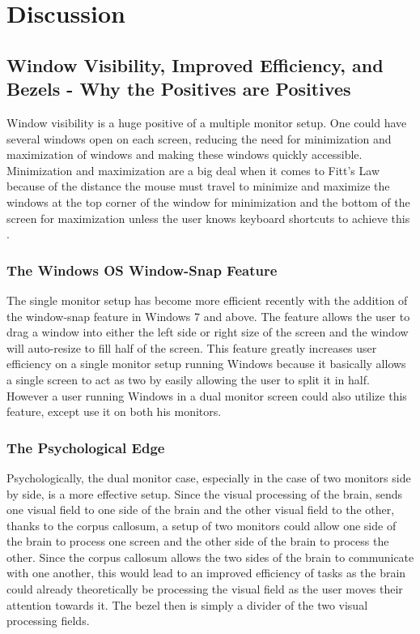 \documentclass[a4paper]{article}
\begin{document}
\section{Discussion}
\subsection{Window Visibility, Improved Efficiency, and Bezels - Why the Positives are Positives}
Window visibility is a huge positive of a multiple monitor setup. One could have several windows open on each screen, reducing the need for minimization and maximization of windows and making these windows quickly accessible. Minimization and maximization are a big deal when it comes to Fitt's Law because of the distance the mouse must travel to minimize and maximize the windows at the top corner of the window for minimization and the bottom of the screen for maximization unless the user knows keyboard shortcuts to achieve this \cite{Tog}.
\subsubsection{The Windows OS Window-Snap Feature}
The single monitor setup has become more efficient recently with the addition of the window-snap feature in Windows 7 and above. The feature allows the user to drag a window into either the left side or right size of the screen and the window will auto-resize to fill half of the screen. This feature greatly increases user efficiency on a single monitor setup running Windows because it basically allows a single screen to act as two by easily allowing the user to split it in half. However a user running Windows in a dual monitor screen could also utilize this feature, except use it on both his monitors.
\subsubsection{The Psychological Edge}
Psychologically, the dual monitor case, especially in the case of two monitors side by side, is a more effective setup. Since the visual processing of the brain, sends one visual field to one side of the brain and the other visual field to the other, thanks to the corpus callosum, a setup of two monitors could allow one side of the brain to process one screen and the other side of the brain to process the other. Since the corpus callosum allows the two sides of the brain to communicate with one another, this would lead to an improved efficiency of tasks as the brain could already theoretically be processing the visual field as the user moves their attention towards it. The bezel then is simply a divider of the two visual processing fields.
\end{document}
